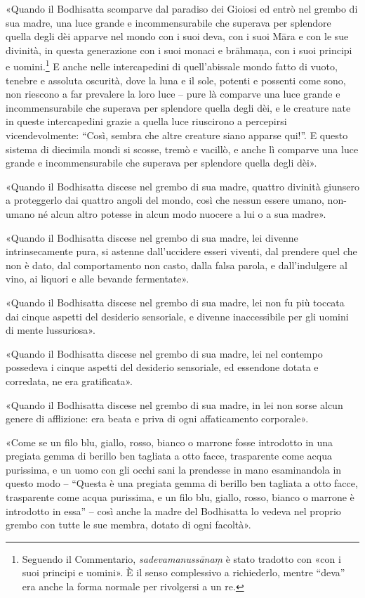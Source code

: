 «Quando il Bodhisatta scomparve dal paradiso dei Gioiosi ed entrò nel grembo di
sua madre, una luce grande e incommensurabile che superava per splendore quella
degli dèi apparve nel mondo con i suoi deva, con i suoi Māra e con le sue
divinità, in questa generazione con i suoi monaci e brāhmaṇa, con i suoi
principi e uomini.\footnote{Seguendo il Commentario, \emph{sadevamanussānaṃ} è
  stato tradotto con «con i suoi principi e uomini». È il senso complessivo a
  richiederlo, mentre “deva” era anche la forma normale per rivolgersi a un re.}
E anche nelle intercapedini di quell’abissale mondo fatto di vuoto, tenebre e
assoluta oscurità, dove la luna e il sole, potenti e possenti come sono, non
riescono a far prevalere la loro luce – pure là comparve una luce grande e
incommensurabile che superava per splendore quella degli dèi, e le creature nate
in queste intercapedini grazie a quella luce riuscirono a percepirsi
vicendevolmente: “Così, sembra che altre creature siano apparse qui!”. E questo
sistema di diecimila mondi si scosse, tremò e vacillò, e anche lì comparve una
luce grande e incommensurabile che superava per splendore quella degli dèi».

«Quando il Bodhisatta discese nel grembo di sua madre, quattro divinità giunsero
a proteggerlo dai quattro angoli del mondo, così che nessun essere umano,
non-umano né alcun altro potesse in alcun modo nuocere a lui o a sua madre».

«Quando il Bodhisatta discese nel grembo di sua madre, lei divenne
intrinsecamente pura, si astenne dall’uccidere esseri viventi, dal prendere quel
che non è dato, dal comportamento non casto, dalla falsa parola, e
dall’indulgere al vino, ai liquori e alle bevande fermentate».

«Quando il Bodhisatta discese nel grembo di sua madre, lei non fu più toccata
dai cinque aspetti del desiderio sensoriale, e divenne inaccessibile per gli
uomini di mente lussuriosa».

«Quando il Bodhisatta discese nel grembo di sua madre, lei nel contempo
possedeva i cinque aspetti del desiderio sensoriale, ed essendone dotata e
corredata, ne era gratificata».

«Quando il Bodhisatta discese nel grembo di sua madre, in lei non sorse alcun
genere di afflizione: era beata e priva di ogni affaticamento corporale».

«Come se un filo blu, giallo, rosso, bianco o marrone fosse introdotto in una
pregiata gemma di berillo ben tagliata a otto facce, trasparente come acqua
purissima, e un uomo con gli occhi sani la prendesse in mano esaminandola in
questo modo – “Questa è una pregiata gemma di berillo ben tagliata a otto facce,
trasparente come acqua purissima, e un filo blu, giallo, rosso, bianco o marrone
è introdotto in essa” – così anche la madre del Bodhisatta lo vedeva nel proprio
grembo con tutte le sue membra, dotato di ogni facoltà».

